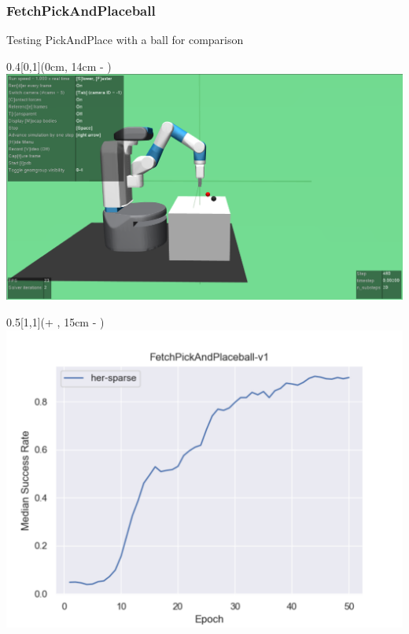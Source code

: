 \begin{frame}
	\frametitle{FetchPickAndPlaceball}	
	\vspace{1cm}
	
	Testing PickAndPlace with a ball for comparison
	
	\begin{textblock*}{0.4\paperwidth}[0,1](0cm, 14cm - \PraesentationSeitenrand)%
		\includegraphics[width=0.4\paperwidth]{./Ressourcen/Figures/FetchPickAndPlaceball-v1.pdf}
	\end{textblock*}
	
	\begin{textblock*}{0.5\paperwidth}[1,1](\textwidth + \PraesentationSeitenrand, 15cm - \PraesentationSeitenrand)%
		\includegraphics[width=0.5\paperwidth]{./Ressourcen/Figures/fig_FetchPickAndPlaceball-v1.pdf}
	\end{textblock*}
	
	
	
\end{frame}
\clearpage

